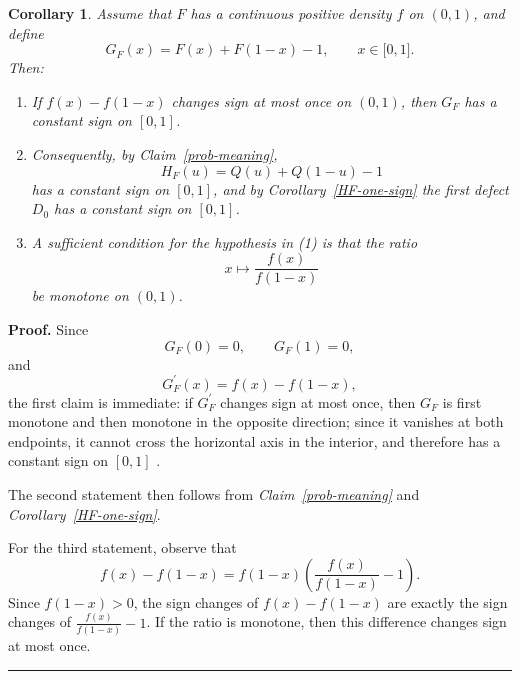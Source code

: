 \documentclass[onecolumn]{article}
\newtheorem{corollary}[theorem]{Corollary}
\newenvironment{proof}[1][Proof]{\noindent\textbf{#1.} }{\ \rule{0.5em}{0.5em}}
\begin{document}
\begin{corollary}
\label{density-conditions} Assume that $F$ has a continuous positive density 
$f$ on $(0,1)$, and define 
\begin{equation}
G_{F}(x)=F(x)+F(1-x)-1,\qquad x\in \lbrack 0,1].  \label{1425}
\end{equation}%
Then:

\begin{enumerate}
\item If $f(x)-f(1-x)$ changes sign at most once on $(0,1)$, then $G_{F}$
has a constant sign on $[0,1]$.

\item Consequently, by \textit{Claim~\ref{prob-meaning}}, 
\begin{equation}
H_{F}(u)=Q(u)+Q(1-u)-1  \label{1426}
\end{equation}%
has a constant sign on $[0,1]$, and by \textit{Corollary~\ref{HF-one-sign}}
the first defect $D_{0}$ has a constant sign on $[0,1]$.

\item A sufficient condition for the hypothesis in \emph{(1)} is that the
ratio 
\begin{equation}
x\longmapsto \frac{f(x)}{f(1-x)}  \label{1427}
\end{equation}%
be monotone on $(0,1)$.
\end{enumerate}
\end{corollary}

\begin{proof}
Since 
\begin{equation}
G_{F}(0)=0,\qquad G_{F}(1)=0,  \label{1428}
\end{equation}%
and 
\begin{equation}
G_{F}^{\prime }(x)=f(x)-f(1-x),  \label{1429}
\end{equation}%
the first claim is immediate: if $G_{F}^{\prime }$ changes sign at most
once, then $G_{F}$ is first monotone and then monotone in the opposite
direction; since it vanishes at both endpoints, it cannot cross the
horizontal axis in the interior, and therefore has a constant sign on $[0,1]$%
.

The second statement then follows from \textit{Claim~\ref{prob-meaning}} and 
\textit{Corollary~\ref{HF-one-sign}}.

For the third statement, observe that 
\begin{equation}
f(x)-f(1-x)=f(1-x)\left( \frac{f(x)}{f(1-x)}-1\right) .  \label{1430}
\end{equation}%
Since $f(1-x)>0$, the sign changes of $f(x)-f(1-x)$ are exactly the sign
changes of $\frac{f(x)}{f(1-x)}-1$. If the ratio is monotone, then this
difference changes sign at most once.
\end{proof}
\end{document}
